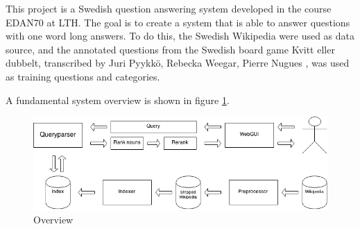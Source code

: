 This project is a Swedish question answering system developed in the course EDAN70 at LTH.
The goal is to create a system that is able to answer questions with one word long answers.
To do this, the Swedish Wikipedia were used as data source, and the annotated questions from the Swedish 
board game Kvitt eller dubbelt, transcribed by Juri Pyykk\"o, Rebecka Weegar, Pierre Nugues \cite{QASYS}, was used as training questions and categories. 

A fundamental system overview is shown in figure \ref{fig:overview}. 

\begin{figure}
\centering
\includegraphics[width=1\textwidth]{figures/Question-answering-system.png}
\caption{Overview}
\label{fig:overview}
\end{figure}
